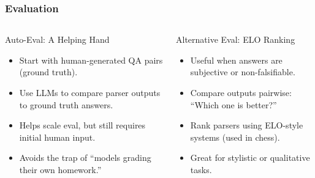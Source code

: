 \begin{frame}[fragile]\frametitle{Evaluation}

\begin{columns}
    \begin{column}[T]{0.5\linewidth}
	Auto-Eval: A Helping Hand
	  \begin{itemize}
		\item Start with human-generated QA pairs (ground truth).
		\item Use LLMs to compare parser outputs to ground truth answers.
		\item Helps scale eval, but still requires initial human input.
		\item Avoids the trap of “models grading their own homework.”
	  \end{itemize}
     
    \end{column}
    \begin{column}[T]{0.5\linewidth}  
	
	Alternative Eval: ELO Ranking
	  \begin{itemize}
		\item Useful when answers are subjective or non-falsifiable.
		\item Compare outputs pairwise: “Which one is better?”
		\item Rank parsers using ELO-style systems (used in chess).
		\item Great for stylistic or qualitative tasks.
	  \end{itemize}
    \end{column}
  \end{columns}    
\end{frame}

